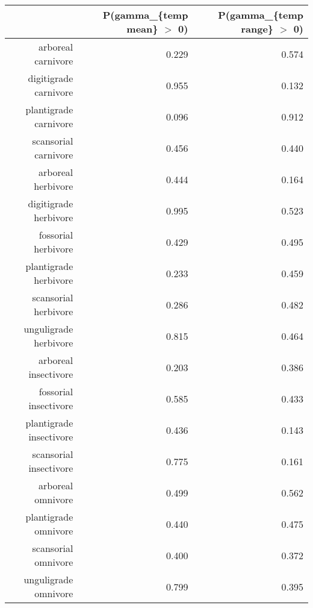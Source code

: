 \begin{table}[ht]
\centering
\begin{tabular}{rrr}
  \hline
 & P(gamma\_\{temp mean\} $>$ 0) & P(gamma\_\{temp range\} $>$ 0) \\ 
  \hline
arboreal carnivore & 0.229 & 0.574 \\ 
  digitigrade carnivore & 0.955 & 0.132 \\ 
  plantigrade carnivore & 0.096 & 0.912 \\ 
  scansorial carnivore & 0.456 & 0.440 \\ 
  arboreal herbivore & 0.444 & 0.164 \\ 
  digitigrade herbivore & 0.995 & 0.523 \\ 
  fossorial herbivore & 0.429 & 0.495 \\ 
  plantigrade herbivore & 0.233 & 0.459 \\ 
  scansorial herbivore & 0.286 & 0.482 \\ 
  unguligrade herbivore & 0.815 & 0.464 \\ 
  arboreal insectivore & 0.203 & 0.386 \\ 
  fossorial insectivore & 0.585 & 0.433 \\ 
  plantigrade insectivore & 0.436 & 0.143 \\ 
  scansorial insectivore & 0.775 & 0.161 \\ 
  arboreal omnivore & 0.499 & 0.562 \\ 
  plantigrade omnivore & 0.440 & 0.475 \\ 
  scansorial omnivore & 0.400 & 0.372 \\ 
  unguligrade omnivore & 0.799 & 0.395 \\ 
   \hline
\end{tabular}
\label{tab:surv_temp}
\end{table}

